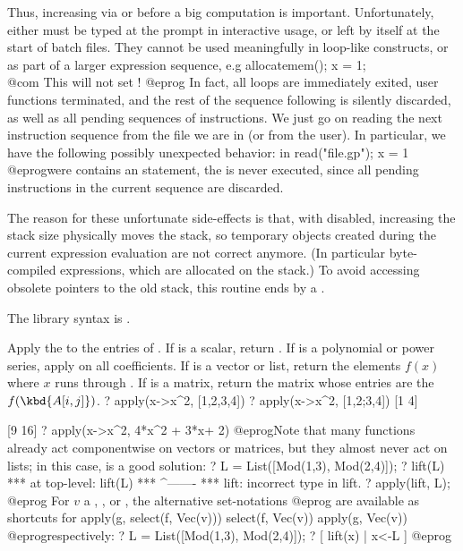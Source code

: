 Thus, increasing  via  or
 before a big computation is important.
Unfortunately, either must be typed at the  prompt in
interactive usage, or left by itself at the start of batch files.
They cannot be used meaningfully in loop-like constructs, or as part of a
larger expression sequence, e.g
\bprog
   allocatemem(); x = 1;   \\@com This will not set !
@eprog\noindent
In fact, all loops are immediately exited, user functions terminated, and
the rest of the sequence following  is silently
discarded, as well as all pending sequences of instructions. We just go on
reading the next instruction sequence from the file we are in (or from the
user). In particular, we have the following possibly unexpected behavior: in
\bprog
   read("file.gp"); x = 1
@eprog\noindent were  contains an  statement,
the  is never executed, since all pending instructions in the
current sequence are discarded.

The reason for these unfortunate side-effects is that, with
 disabled, increasing the stack size physically
moves the stack, so temporary objects created during the current expression
evaluation are not correct anymore. (In particular byte-compiled expressions,
which are allocated on the stack.) To avoid accessing obsolete pointers to
the old stack, this routine ends by a .

The library syntax is .

\label{se:apply}
Apply the   to the entries of . If 
is a scalar, return . If  is a polynomial or power series,
apply  on all coefficients. If  is a vector or list, return
the elements $f(x)$ where $x$ runs through . If  is a matrix,
return the matrix whose entries are the $f(\kbd{A[i,j]})$.
\bprog
? apply(x->x^2, [1,2,3,4])
? apply(x->x^2, [1,2;3,4])
[1 4]

[9 16]
? apply(x->x^2, 4*x^2 + 3*x+ 2)
@eprog\noindent Note that many functions already act componentwise on
vectors or matrices, but they almost never act on lists; in this
case,  is a good solution:
\bprog
? L = List([Mod(1,3), Mod(2,4)]);
? lift(L)
  ***   at top-level: lift(L)
  ***                 ^-------
  *** lift: incorrect type in lift.
? apply(lift, L);
@eprog
 For $v$ a , ,  or ,
the alternative set-notations
\bprog
[g(x) | x <- v, f(x)]
[x | x <- v, f(x)]
[g(x) | x <- v]
@eprog\noindent
are available as shortcuts for
\bprog
apply(g, select(f, Vec(v)))
select(f, Vec(v))
apply(g, Vec(v))
@eprog\noindent respectively:
\bprog
? L = List([Mod(1,3), Mod(2,4)]);
? [ lift(x) | x<-L ]
@eprog

